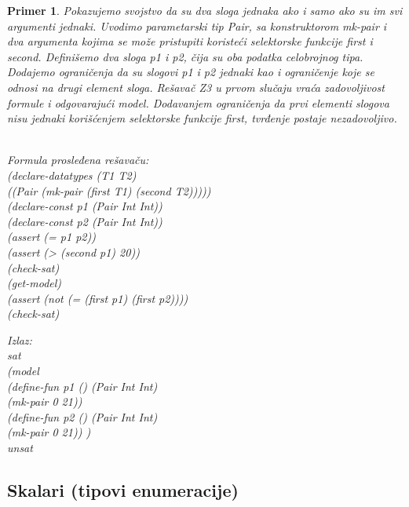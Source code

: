 \documentclass[12pt,oneside]{memoir}
\newtheorem{primer}{Primer}
\begin{document}
\begin{primer} Pokazujemo svojstvo da su dva sloga jednaka ako i samo ako su im svi argumenti jednaki. Uvodimo parametarski tip Pair, sa konstruktorom mk-pair i dva argumenta kojima se može pristupiti koristeći selektorske funkcije first i second. Definišemo dva sloga p1 i p2, čija su oba podatka celobrojnog tipa. Dodajemo ograničenja da su slogovi p1 i p2 jednaki kao i ograničenje koje se odnosi na drugi element sloga. Rešavač Z3 u prvom slučaju vraća zadovoljivost formule i odgovarajući model. Dodavanjem ograničenja da prvi elementi slogova nisu jednaki korišćenjem selektorske funkcije first, tvrđenje postaje nezadovoljivo.
\\ \\
\begin{minipage}[b]{0.5\textwidth}
Formula prosleđena rešavaču:
\\(declare-datatypes (T1 T2) 
\\((Pair (mk-pair (first T1) (second T2)))))
\\(declare-const p1 (Pair Int Int))
\\(declare-const p2 (Pair Int Int))
\\(assert (= p1 p2))
\\(assert (> (second p1) 20))
\\(check-sat)
\\(get-model)
\\(assert (not (= (first p1) (first p2))))
\\(check-sat)
\end{minipage}
\hspace{2cm} 
\begin{minipage}[t]{0.5\textwidth}
\vspace{-6.5cm}
Izlaz:
\\sat 
\\(model 
\\(define-fun p1 () (Pair Int Int) 
\\(mk-pair 0 21)) 
\\(define-fun p2 () (Pair Int Int) 
\\(mk-pair 0 21)) )
\\unsat
\end{minipage}

\end{primer}
\subsection{Skalari (tipovi enumeracije)}
\end{document}
